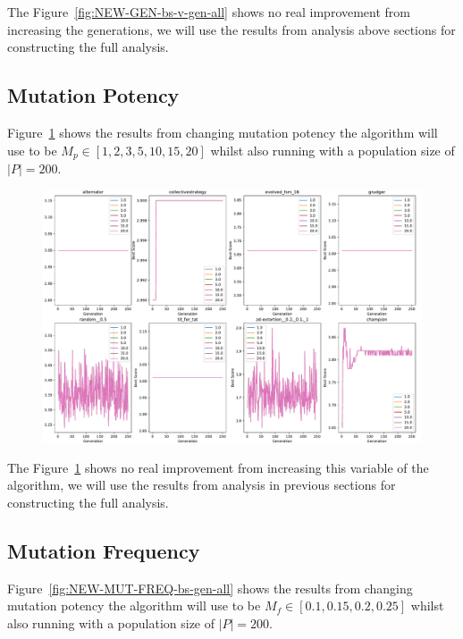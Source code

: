 The Figure~\ref{fig:NEW-GEN-bs-v-gen-all} shows no real improvement from increasing the generations, we will use the results from analysis above sections for constructing the full analysis.

\subsection{Mutation Potency}\label{subsec:mutationPotency}
Figure~\ref{fig:NEW-MUT-POT-bs-v-gen-all} shows the results from changing mutation potency the algorithm will use to be \(M_p \in [1,2,3,5,10,15,20] \) whilst also running with a population size of \(|P|=200\).

\begin{figure}[ht]
    \includegraphics[width=1.0\textwidth, center]{./img/plots/NEW_MUT_POT_bs_v_gen_all.pdf}
    \caption{}\label{fig:NEW-MUT-POT-bs-v-gen-all}
\end{figure}

The Figure~\ref{fig:NEW-MUT-POT-bs-v-gen-all} shows no real improvement from increasing this variable of the algorithm, we will use the results from analysis in previous sections for constructing the full analysis.

\subsection{Mutation Frequency}\label{subsec:mutationFrequency}
Figure~\ref{fig:NEW-MUT-FREQ-bs-gen-all} shows the results from changing mutation potency the algorithm will use to be \(M_f \in [0.1,0.15,0.2,0.25] \) whilst also running with a population size of \(|P|=200\).

